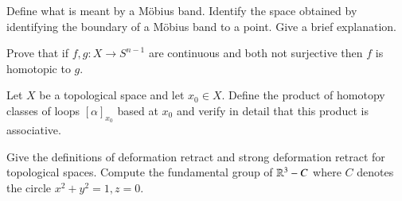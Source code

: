 \documentclass[12pt]{exam}
\theoremstyle{definition}
\newcommand{\R}{\mathcal{R}}
\def\R{{ \Bbb R}}
\begin{document}
\begin{questions}

\question

Define what is meant by a M\"obius band. Identify the space obtained
by identifying the boundary of a M\"obius band to a point. Give a
brief explanation.

\question

Prove that if $f,g:X \rightarrow S^{n-1}$ are continuous and both
not surjective then $f$ is homotopic to $g$.

\question

Let $X$ be a topological space and let $x_0 \in X$. Define the
product of homotopy classes of loops $[\alpha]_{x_0}$ based at $x_0$
and verify in detail that this product is associative.

\question Give the definitions of deformation retract and strong
deformation retract for topological spaces. Compute the fundamental
group of $\R^3-C$ where $C$ denotes the circle $x^2+y^2=1,z=0$.











\end{questions}
\end{document}
